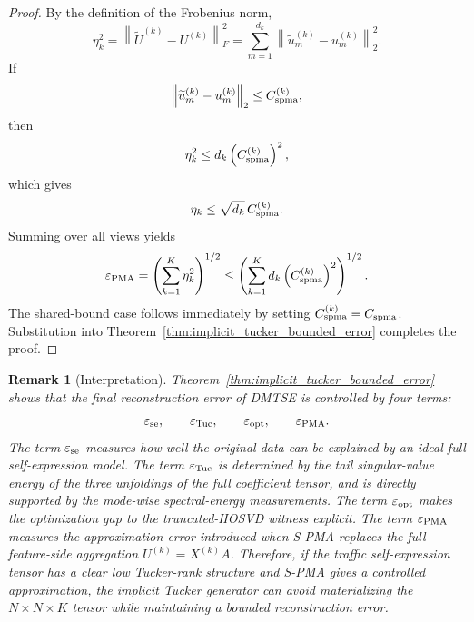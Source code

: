 \documentclass[11pt]{article}
\newtheorem{remark}{Remark}
\begin{document}
\begin{proof}
	By the definition of the Frobenius norm,
	\[
	\eta_k^2
	=
	\left\|
	\widetilde U^{(k)}-U^{(k)}
	\right\|_F^2
	=
	\sum_{m=1}^{d_k}
	\left\|
	\widetilde u_m^{(k)}-u_m^{(k)}
	\right\|_2^2 .
	\]
	If
	\[
	\left\|
	\widetilde u_m^{(k)}-u_m^{(k)}
	\right\|_2
	\le
	C_{\rm spma}^{(k)},
	\]
	then
	\[
	\eta_k^2
	\le
	d_k
	\left(C_{\rm spma}^{(k)}\right)^2,
	\]
	which gives
	\[
	\eta_k
	\le
	\sqrt{d_k}\,C_{\rm spma}^{(k)}.
	\]
	Summing over all views yields
	\[
	\varepsilon_{\rm PMA}
	=
	\left(
	\sum_{k=1}^{K}
	\eta_k^2
	\right)^{1/2}
	\le
	\left(
	\sum_{k=1}^{K}
	d_k
	\left(C_{\rm spma}^{(k)}\right)^2
	\right)^{1/2}.
	\]
	The shared-bound case follows immediately by setting $C_{\rm spma}^{(k)}=C_{\rm spma}$. Substitution into Theorem~\ref{thm:implicit_tucker_bounded_error} completes the proof.
\end{proof}

\begin{remark}[Interpretation]
	Theorem~\ref{thm:implicit_tucker_bounded_error} shows that the final reconstruction error of DMTSE is controlled by four terms:
	\[
	\varepsilon_{\rm se},
	\qquad
	\varepsilon_{\rm Tuc},
	\qquad
	\varepsilon_{\rm opt},
	\qquad
	\varepsilon_{\rm PMA}.
	\]
	The term $\varepsilon_{\rm se}$ measures how well the original data can be explained by an ideal full self-expression model. The term $\varepsilon_{\rm Tuc}$ is determined by the tail singular-value energy of the three unfoldings of the full coefficient tensor, and is directly supported by the mode-wise spectral-energy measurements. The term $\varepsilon_{\rm opt}$ makes the optimization gap to the truncated-HOSVD witness explicit. The term $\varepsilon_{\rm PMA}$ measures the approximation error introduced when S-PMA replaces the full feature-side aggregation $U^{(k)}=X^{(k)}A$. Therefore, if the traffic self-expression tensor has a clear low Tucker-rank structure and S-PMA gives a controlled approximation, the implicit Tucker generator can avoid materializing the $N\times N\times K$ tensor while maintaining a bounded reconstruction error.
\end{remark}
\end{document}
